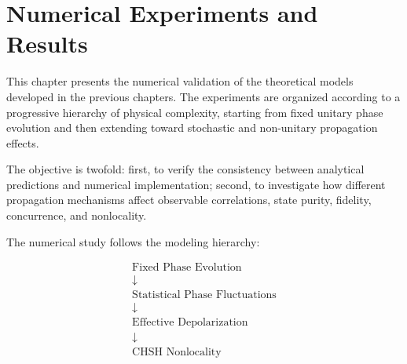 
\chapter{Numerical Experiments and Results}
\label{ch:numerical_experiments}

This chapter presents the numerical validation of the theoretical models developed in the previous chapters. The experiments are organized according to a progressive hierarchy of physical complexity, starting from fixed unitary phase evolution and then extending toward stochastic and non-unitary propagation effects.

The objective is twofold: first, to verify the consistency between analytical predictions and numerical implementation; second, to investigate how different propagation mechanisms affect observable correlations, state purity, fidelity, concurrence, and nonlocality.

The numerical study follows the modeling hierarchy:

\[
\begin{array}{c}
\text{Fixed Phase Evolution}
\\
\downarrow
\\
\text{Statistical Phase Fluctuations}
\\
\downarrow
\\
\text{Effective Depolarization}
\\
\downarrow
\\
\text{CHSH Nonlocality}
\end{array}
\]






